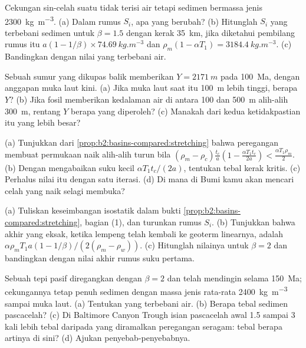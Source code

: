 \begin{exercise}[$\star\star$]\label{exo:b2:basins-compared:8}
Cekungan sin-celah suatu  tidak terisi air tetapi sedimen bermassa jenis
\qty{2300}{kg.m^{-3}}. (a) Dalam rumus $S_i$, apa yang berubah? (b) Hitunglah $S_i$ yang terbebani sedimen
untuk $\beta = 1.5$ dengan kerak \qty{35}{km}, jika diketahui pembilang rumus itu
$a(1 - 1/\beta)\times\qty{74.69}{kg.m^{-3}}$ dan $\rho_m(1 - \alpha T_1) =
\qty{3184.4}{kg.m^{-3}}$. (c) Bandingkan dengan nilai yang terbebani air.
\end{exercise}

\begin{exercise}[$\star\star$]\label{exo:b2:basins-compared:9}
Sebuah sumur yang dikupas balik memberikan $Y = \qty{2171}{m}$ pada \qty{100}{Ma}, dengan anggapan muka laut kini. (a)
Jika muka laut saat itu \qty{100}{m} lebih tinggi, berapa $Y$? (b) Jika fosil memberikan kedalaman air
di antara 100 dan \qty{500}{m} alih-alih \qty{300}{m}, rentang $Y$ berapa yang diperoleh? (c) Manakah dari
kedua ketidakpastian itu yang lebih besar?
\end{exercise}

\begin{exercise}[$\star\star\star$]\label{exo:b2:basins-compared:10}
(a) Tunjukkan dari \cref{prop:b2:basins-compared:stretching} bahwa peregangan membuat permukaan naik
alih-alih turun bila $(\rho_m - \rho_c)\frac{t_c}{a}\left(1 - \frac{\alpha T_1 t_c}{2a}\right) <
\frac{\alpha T_1\rho_m}{2}$. (b) Dengan mengabaikan suku kecil $\alpha T_1 t_c/(2a)$, tentukan
tebal kerak kritis. (c) Perhalus nilai itu dengan satu iterasi. (d) Di mana di Bumi kamu akan mencari
celah yang naik selagi membuka?
\end{exercise}

\begin{exercise}[$\star\star\star$]\label{exo:b2:basins-compared:11}
(a) Tuliskan keseimbangan isostatik dalam bukti \cref{prop:b2:basins-compared:stretching}, bagian
(1), dan turunkan rumus $S_i$. (b) Tunjukkan bahwa  akhir yang eksak, ketika
lempeng telah kembali ke geoterm linearnya, adalah $\alpha\rho_m T_1 a(1 - 1/\beta)/(2(\rho_m -
\rho_w))$. (c) Hitunglah nilainya untuk $\beta = 2$ dan bandingkan dengan nilai akhir
rumus suku pertama.
\end{exercise}

\begin{exercise}[$\star\star\star$]\label{exo:b2:basins-compared:12}
Sebuah tepi pasif diregangkan dengan $\beta = 2$ dan telah mendingin selama \qty{150}{Ma}; cekungannya
tetap penuh sedimen dengan massa jenis rata-rata \qty{2400}{kg.m^{-3}} sampai muka laut.
(a) Tentukan  yang terbebani air. (b) Berapa tebal sedimen pascacelah?
(c) Di Baltimore Canyon Trough isian pascacelah awal 1.5 sampai 3 kali lebih tebal daripada
yang diramalkan peregangan seragam: tebal berapa artinya di sini? (d) Ajukan penyebab-penyebabnya.
\end{exercise}

